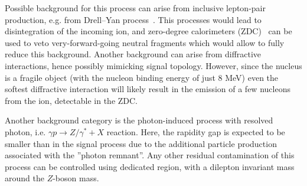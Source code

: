 
Possible background for this process can arise from inclusive lepton-pair production, e.g. from Drell--Yan process~\cite{Drell:1970wh,Aad:2015gta,Khachatryan:2015pzs,Alice:2016wka}.
This processes would lead to disintegration of the incoming ion, and zero-degree calorimeters (ZDC)~\cite{Dellacasa:1999ke,ATLAS:2007aa} can be used to veto very-forward-going neutral fragments which would allow to fully reduce this background.
Another background can arise from diffractive interactions, hence possibly mimicking signal topology.
However, since the nucleus is a fragile object (with the nucleon binding energy of just 8 MeV) even the softest diffractive interaction will likely result in the emission of a few nucleons from the ion, detectable in the ZDC.

Another background category is the photon-induced process with resolved photon, i.e. 
$\gamma p\rightarrow Z/\gamma^*+X$ reaction.
Here, the rapidity gap is expected to be smaller than in the signal process due to the additional particle production associated with the ''photon remnant''.
Any other residual contamination of this process can be controlled using dedicated region, with a dilepton invariant mass around the $Z$-boson mass.



